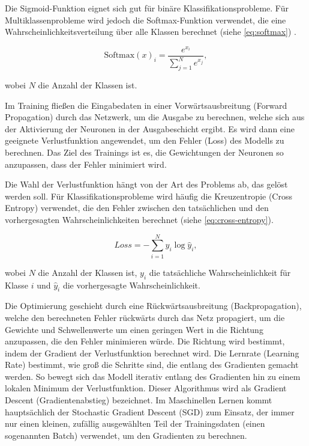 Die Sigmoid-Funktion eignet sich gut für binäre Klassifikationsprobleme. Für Multiklassenprobleme wird jedoch die Softmax-Funktion verwendet, die eine Wahrscheinlichkeitsverteilung über alle Klassen berechnet (siehe \autoref{eq:softmax}) \parencite{Goodfellow2016deeplearning}.

\begin{equation}
	\text{Softmax}(x)_i = \frac{e^{x_i}}{\sum_{j=1}^{N} e^{x_j}},
	\label{eq:softmax}
\end{equation}

wobei $N$ die Anzahl der Klassen ist.

Im Training fließen die Eingabedaten in einer Vorwärtsausbreitung (Forward Propagation) durch das Netzwerk, um die Ausgabe zu berechnen, welche sich aus der Aktivierung der Neuronen in der Ausgabeschicht ergibt. Es wird dann eine geeignete Verlustfunktion angewendet, um den Fehler (Loss) des Modells zu berechnen. Das Ziel des Trainings ist es, die Gewichtungen der Neuronen so anzupassen, dass der Fehler minimiert wird.

Die Wahl der Verlustfunktion hängt von der Art des Problems ab, das gelöst werden soll. Für Klassifikationsprobleme wird häufig die Kreuzentropie (Cross Entropy) verwendet, die den Fehler zwischen den tatsächlichen und den vorhergesagten Wahrscheinlichkeiten berechnet (siehe \autoref{eq:cross-entropy}).

\begin{equation}
	Loss = - \sum_{i=1}^{N} y_i \log \hat{y}_i,
	\label{eq:cross-entropy}
\end{equation}

wobei $N$ die Anzahl der Klassen ist, $y_i$ die tatsächliche Wahrscheinlichkeit für Klasse $i$ und $\hat{y}_i$ die vorhergesagte Wahrscheinlichkeit.

Die Optimierung geschieht durch eine Rückwärtsausbreitung (Backpropagation), welche den berechneten Fehler rückwärts durch das Netz propagiert, um die Gewichte und Schwellenwerte um einen geringen Wert in die Richtung anzupassen, die den Fehler minimieren würde. Die Richtung wird bestimmt, indem der Gradient der Verlustfunktion berechnet wird. Die Lernrate (Learning Rate) bestimmt, wie groß die Schritte sind, die entlang des Gradienten gemacht werden. So bewegt sich das Modell iterativ entlang des Gradienten hin zu einem lokalen Minimum der Verlustfunktion. Dieser Algorithmus wird als Gradient Descent (Gradientenabstieg) bezeichnet. Im Maschinellen Lernen kommt hauptsächlich der Stochastic Gradient Descent (SGD) zum Einsatz, der immer nur einen kleinen, zufällig ausgewählten Teil der Trainingsdaten (einen sogenannten Batch) verwendet, um den Gradienten zu berechnen.

